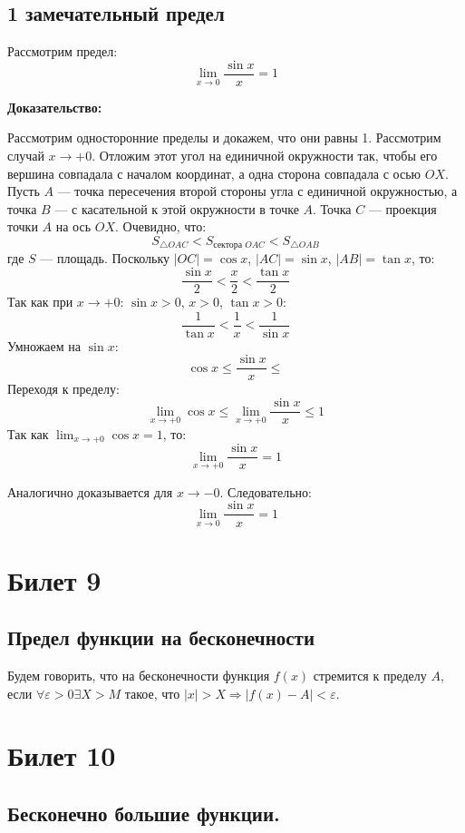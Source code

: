 \documentclass{article}
\begin{document}
\subsection*{1 замечательный предел}
Рассмотрим предел:
\[
\lim_{x \to 0} \frac{\sin x}{x} = 1
\]

\textbf{Доказательство:}

Рассмотрим односторонние пределы и докажем, что они равны 1. Рассмотрим случай \( x \to +0 \). Отложим этот угол на единичной окружности так, чтобы его вершина совпадала с началом координат, а одна сторона совпадала с осью \( OX \). Пусть \( A \) — точка пересечения второй стороны угла с единичной окружностью, а точка \( B \) — с касательной к этой окружности в точке \( A \). Точка \( C \) — проекция точки \( A \) на ось \( OX \). Очевидно, что:
\[
S_{\triangle OAC} < S_{\text{сектора } OAC} < S_{\triangle OAB}
\]
где \( S \) — площадь. Поскольку \( |OC| = \cos x \), \( |AC| = \sin x \), \( |AB| = \tan x \), то:
\[
\frac{\sin x}{2} < \frac{x}{2} < \frac{\tan x}{2}
\]
Так как при \( x \to +0 \): \( \sin x > 0 \), \( x > 0 \), \( \tan x > 0 \):
\[
\frac{1}{\tan x} < \frac{1}{x} < \frac{1}{\sin x}
\]
Умножаем на \( \sin x \):
\[
\cos x \leq \frac{\sin x}{x} \leq 
\]
Переходя к пределу:
\[
\lim_{x \to +0} \cos x \leq \lim_{x \to +0} \frac{\sin x}{x} \leq 1
\]
Так как \( \lim_{x \to +0} \cos x = 1 \), то:
\[
\lim_{x \to +0} \frac{\sin x}{x} = 1
\]

Аналогично доказывается для \( x \to -0 \). Следовательно:
\[
\lim_{x \to 0} \frac{\sin x}{x} = 1
\]

\section{Билет 9}

\subsection*{Предел функции на бесконечности}
Будем говорить, что на бесконечности функция \( f(x) \) стремится к пределу \( A \), если \( \forall \varepsilon > 0 \exists X > M \) такое, что \( |x| > X \Rightarrow |f(x) - A| < \varepsilon \).

\section{Билет 10}

\subsection*{Бесконечно большие функции.}
\end{document}
